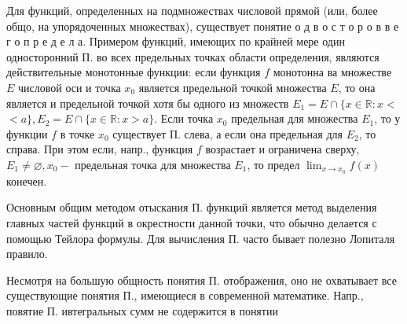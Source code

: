 \documentclass[10pt]{article}
\begin{document}
Для функций, определенных на подмножествах числовой прямой (или, более общо, на упорядоченных множествах), существует понятие о д в о с т о р о в в е г о п р е д е л а. Примером функций, имеющих по крайней мере один односторонний П. во всех предельных точках области определения, являются действительные монотонные функции: если функция $f$ монотонна ва множестве $E$ числовой оси и точка $x_{0}$ является предельной точкой множества $E$, то она является и предельной точкой хотя бы одного из множеств $E_{1}=E \cap\{x \in \mathbb{R}: x<$ $<a\}, E_{2}=E \cap\{x \in \mathbb{R}: x>a\}$. Если точка $x_{0}$ предельная для множества $E_{1}$, то у функции $f$ в точке $x_{0}$ существует П. слева, а если она предельная для $E_{2}$, то справа. При этом если, напр., функция $f$ возрастает и ограничена сверху, $E_{1} \neq \varnothing, x_{0}-$ предельная точка для множества $E_{1}$, то предел $\lim _{x \rightarrow x_{0}} f(x)$ конечен.



Основным общим методом отыскания П. функций является метод выделения главных частей функций в окрестности данной точки, что обычно делается с помощью Тейлора формулы. Для вычисления П. часто бывает полезно Лопиталя правило.



Несмотря на большую общность понятия П. отображения, оно не охватывает все существующие понятия П., имеющиеся в современной математике. Напр., повятие П. ивтегральных сумм не содержится в понятии
\end{document}
